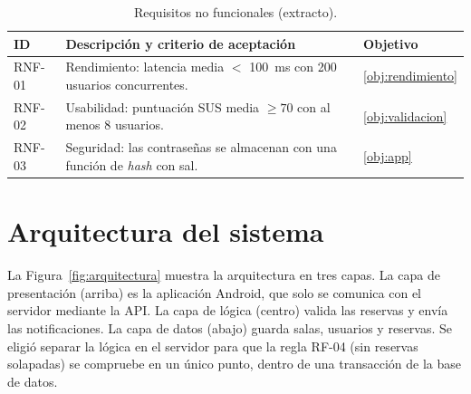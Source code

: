 \begin{table}[htbp]
  \centering
  \caption{Requisitos no funcionales (extracto).}
  \label{tab:rnf}
  \small
  \begin{tabularx}{\textwidth}{@{}lLl@{}}
    \toprule
    \textbf{ID} & \textbf{Descripción y criterio de aceptación} & \textbf{Objetivo} \\
    \midrule
    RNF-01 & Rendimiento: latencia media $<$ \qty{100}{ms} con 200 usuarios concurrentes. & \ref{obj:rendimiento} \\
    RNF-02 & Usabilidad: puntuación \ac{SUS} media $\geq 70$ con al menos 8 usuarios. & \ref{obj:validacion} \\
    RNF-03 & Seguridad: las contraseñas se almacenan con una función de \emph{hash} con sal. & \ref{obj:app} \\
    \bottomrule
  \end{tabularx}
\end{table}


\section{Arquitectura del sistema}
\label{sec:arquitectura}

La Figura~\ref{fig:arquitectura} muestra la arquitectura en tres capas. La capa
de presentación (arriba) es la aplicación Android, que solo se comunica con el
servidor mediante la \ac{API}. La capa de lógica (centro) valida las reservas y
envía las notificaciones. La capa de datos (abajo) guarda salas, usuarios y
reservas. Se eligió separar la lógica en el servidor para que la regla RF-04
(sin reservas solapadas) se compruebe en un único punto, dentro de una
transacción de la base de datos.

